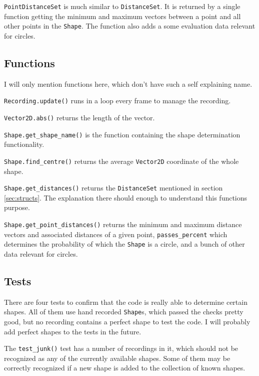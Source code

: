 \documentclass[12pt, a4paper]{article}
\begin{document}
{                \texttt{PointDistanceSet} is much similar to \texttt{DistanceSet}. It is returned by a single function getting the minimum and maximum vectors between a point and all other points in the \texttt{Shape}. The function also adds a some evaluation data relevant for circles.

            \subsection{Functions}
                I will only mention functions here, which don't have such a self explaining name.\break

                \texttt{Recording.update()} runs in a loop every frame to manage the recording.\break

                \texttt{Vector2D.abs()} returns the length of the vector.\break

                \texttt{Shape.get\_shape\_name()} is the function containing the shape determination functionality.\break

                \texttt{Shape.find\_centre()} returns the average \texttt{Vector2D} coordinate of the whole shape.\break

                \texttt{Shape.get\_distances()} returns the \texttt{DistanceSet} mentioned in section \ref{sec:structs}. The explanation there should enough to understand this functions purpose.\break

                \texttt{Shape.get\_point\_distances()} returns the minimum and maximum distance vectors and associated distances of a given point, \texttt{passes\_percent} which determines the probability of which the \texttt{Shape} is a circle, and a bunch of other data relevant for circles.

        }
        \subsection{Tests}
            There are four tests to confirm that the code is really able to determine certain shapes. All of them use hand recorded \texttt{Shape}s, which passed the checks pretty good, but no recording contains a perfect shape to test the code. I will probably add perfect shapes to the tests in the future.

            The \texttt{test\_junk()} test has a number of recordings in it, which should not be recognized as any of the currently available shapes. Some of them may be correctly recognized if a new shape is added to the collection of known shapes.
\end{document}
